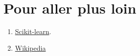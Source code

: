 \documentclass[a0,portrait]{a0poster}
\begin{document}
\color{DarkSlateGray} %


\nocite{*} %


\section*{Pour aller plus loin}

\begin{enumerate}
    \item \href{https://scikit-learn.org}{Scikit-learn}.
    \item \href{https://fr.wikipedia.org/wiki/R\%C3\%A9seau_de_neurones_artificiels}{Wikipedia}  
\end{enumerate}


\end{document}
